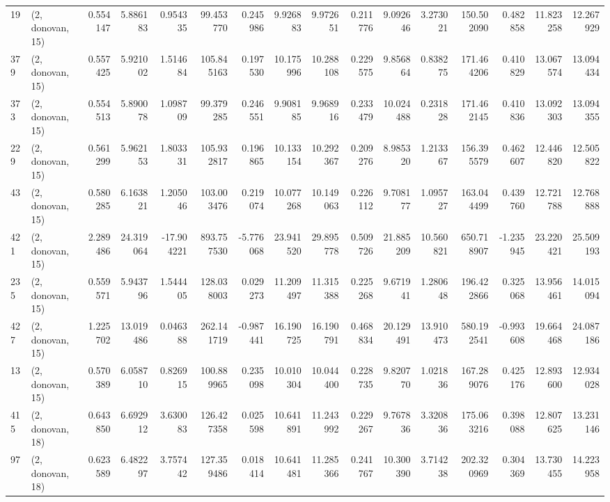 \begin{tabular}{llrrrrrrrrrrrrrr}
19  &  (2, donovan, 15) &   0.554147 &   5.886183 &   0.954335 &    99.453770 &   0.245986 &   9.926883 &   9.972651 &  0.211776 &   9.092646 &   3.273021 &   150.502090 &  0.482858 &  11.823258 &  12.267929 \\
379 &  (2, donovan, 15) &   0.557425 &   5.921002 &   1.514684 &   105.845163 &   0.197530 &  10.175996 &  10.288108 &  0.229575 &   9.856864 &   0.838275 &   171.464206 &  0.410829 &  13.067574 &  13.094434 \\
373 &  (2, donovan, 15) &   0.554513 &   5.890078 &   1.098709 &    99.379285 &   0.246551 &   9.908185 &   9.968916 &  0.233479 &  10.024488 &   0.231828 &   171.462145 &  0.410836 &  13.092303 &  13.094355 \\
229 &  (2, donovan, 15) &   0.561299 &   5.962153 &   1.803331 &   105.932817 &   0.196865 &  10.133154 &  10.292367 &  0.209276 &   8.985320 &   1.213367 &   156.395579 &  0.462607 &  12.446820 &  12.505822 \\
43  &  (2, donovan, 15) &   0.580285 &   6.163821 &   1.205046 &   103.003476 &   0.219074 &  10.077268 &  10.149063 &  0.226112 &   9.708177 &   1.095727 &   163.044499 &  0.439760 &  12.721788 &  12.768888 \\
421 &  (2, donovan, 15) &   2.289486 &  24.319064 & -17.904221 &   893.757530 &  -5.776068 &  23.941520 &  29.895778 &  0.509726 &  21.885209 &  10.560821 &   650.718907 & -1.235945 &  23.220421 &  25.509193 \\
235 &  (2, donovan, 15) &   0.559571 &   5.943796 &   1.544405 &   128.038003 &   0.029273 &  11.209497 &  11.315388 &  0.225268 &   9.671941 &   1.280648 &   196.422866 &  0.325068 &  13.956461 &  14.015094 \\
427 &  (2, donovan, 15) &   1.225702 &  13.019486 &   0.046388 &   262.141719 &  -0.987441 &  16.190725 &  16.190791 &  0.468834 &  20.129491 &  13.910473 &   580.192541 & -0.993608 &  19.664468 &  24.087186 \\
13  &  (2, donovan, 15) &   0.570389 &   6.058710 &   0.826915 &   100.889965 &   0.235098 &  10.010304 &  10.044400 &  0.228735 &   9.820770 &   1.021836 &   167.289076 &  0.425176 &  12.893600 &  12.934028 \\
415 &  (2, donovan, 18) &   0.643850 &   6.692912 &   3.630083 &   126.427358 &   0.025598 &  10.641891 &  11.243992 &  0.229267 &   9.767836 &   3.320836 &   175.063216 &  0.398088 &  12.807625 &  13.231146 \\
97  &  (2, donovan, 18) &   0.623589 &   6.482297 &   3.757442 &   127.359486 &   0.018414 &  10.641481 &  11.285366 &  0.241767 &  10.300390 &   3.714238 &   202.320969 &  0.304369 &  13.730455 &  14.223958 \\

\end{tabular}

